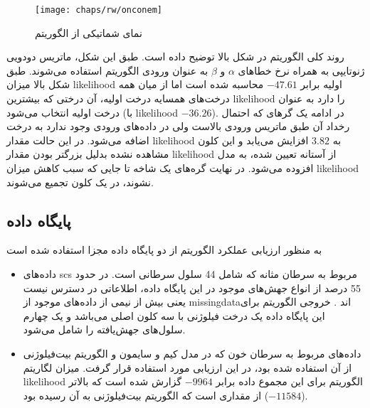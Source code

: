 \begin{figure}[!ht]
	\centerline{\texttt{[image: chaps/rw/onconem]}}
	\caption{نمای شماتیکی از الگوریتم  \cite{ross2016onconem}}
	\label{fig:ch_rw:onconem}
\end{figure}

روند کلی الگوریتم  در شکل بالا توضیح داده است. طبق این شکل، ماتریس دودویی ژنوتایپی به همراه نرخ خطاهای $\alpha$ و $\beta$ به عنوان ورودی الگوریتم استفاده می‌شوند. طبق شکل بالا میزان \gls{likelihood} اولیه برابر $-47.61$  محاسبه شده است اما از میان همه درخت‌های همسایه درخت اولیه، آن درختی که بیشترین \gls{likelihood} را دارد به عنوان درخت اولیه انتخاب می‌شود (با \gls{likelihood} $-36.26$). در ادامه یک گرهای که احتمال رخداد آن طبق ماتریس ورودی بالاست ولی در داده‌های ورودی وجود ندارد به درخت اضافه می‌شود. در این حالت مقدار \gls{likelihood} به $3.82$ افزایش می‌یابد و این کلون مشاهده نشده بدلیل بزرگتر بودن مقدار \gls{likelihood} از آستانه تعیین شده، به مدل افزوده می‌شود. در نهایت گره‌های یک شاخه تا جایی که سبب کاهش میزان \gls{likelihood} نشوند، در یک کلون تجمیع می‌شوند. 
\subsection{پایگاه داده}

به منظور ارزیابی عملکرد الگوریتم  از دو پایگاه داده مجزا استفاده شده است
\begin{itemize}
	\item     داده‌های  \gls{scs} مربوط به سرطان مثانه که شامل 44 سلول سرطانی است. در حدود 55 درصد از انواع جهش‌های موجود در این پایگاه داده، اطلاعاتی در دسترس نیست یعنی بیش از نیمی از داده‌های موجود از \gls{missingdata}‌اند . خروجی الگوریتم  برای این پایگاه داده یک درخت فیلوژنی با سه کلون اصلی می‌باشد و یک چهارم سلول‌های جهش‌یافته را شامل می‌شود.  
	\item     داده‌های مربوط به سرطان خون که در مدل کیم و سایمون و الگوریتم بیت‌فیلوژنی از آن استفاده شده بود، در این ارزیابی مورد استفاده قرار گرفت. میزان لگاریتم \gls{likelihood} الگوریتم  برای این مجموع داده برابر $-9964$ گزارش شده است که بالاتر از مقداری است که الگوریتم بیت‌فیلوژنی به آن رسیده بود ($-11584$).  
\end{itemize}


